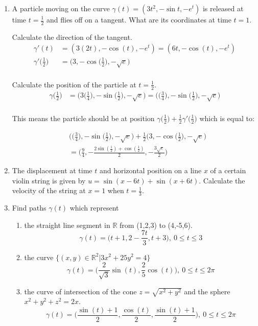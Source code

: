 \documentclass{article}
\begin{document}
\thispagestyle{fancy}

\begin{enumerate}
\item A particle moving on the curve $\gamma(t) = (3t^2, -\sin t, -e^t)$ is released at time $t=\frac{1}{2}$ and flies off on a tangent. What are its coordinates at time $t=1$.

Calculate the direction of the tangent.
\begin{align*} 
    \gamma'(t) &= (3(2t), -\cos(t), -e^t) = (6t,-\cos(t), -e^t) \\
    \gamma'\Big(\frac{1}{2}\Big) &= \Big(3, -\cos\Big(\frac{1}{2}\Big), -\sqrt{e}\Big)\\
\end{align*}

Calculate the position of the particle at $t=\frac{1}{2}$.
\begin{align*} 
    \gamma\Big(\frac{1}{2}\Big) &= \Big(3\Big(\frac{1}{4}\Big), -\sin\Big(\frac{1}{2}\Big), -\sqrt{e}\Big) = \Big(\Big(\frac{3}{4}\Big), -\sin\Big(\frac{1}{2}\Big), -\sqrt{e}\Big)\\
\end{align*}

This means the particle should be at position $\displaystyle \gamma \Big(\frac{1}{2}\Big) + \frac{1}{2} \gamma' \Big( \frac{1}{2} \Big)$ which is equal to:

\begin{align*} 
    & \Big(\Big(\frac{3}{4}\Big), -\sin\Big(\frac{1}{2}\Big), -\sqrt{e}\Big) + \frac{1}{2}\Big(3, -\cos\Big(\frac{1}{2}\Big), -\sqrt{e}\Big) \\
    &= \Big(\frac{9}{4}, -\frac{ 2 \sin(\frac{1}{2}) + \cos(\frac{1}{2})}{2},-\frac{3\sqrt{e}}{2}\Big)
\end{align*}
\newpage
\item The displacement at time $t$ and horizontal position on a line $x$ of a certain violin string is given by $u=\sin(x-6t) + \sin(x+6t)$. Calculate the velocity of the string at $x=1$ when $t=\frac{1}{3}$.

\newpage
\item Find paths $\gamma(t)$ which represent
\begin{enumerate}
    \item the straight line segment in $\mathbb{R}$ from (1,2,3) to (4,-5,6).
        \[ \gamma(t) = \Big(t+1,2-\frac{7t}{3}, t+3 \Big),\: 0 \leq t \leq 3 \]
    \item the curve $\{(x,y)\in \mathbb{R}^2|3x^2+25y^2=4\}$
        \[ \gamma(t) = \Big(\frac{2}{\sqrt{3}} \sin(t), \frac{2}{5}\cos(t)\Big), \: 0 \leq t \leq 2\pi \]
    \item the curve of intersection of the cone $z=\sqrt{x^2 + y^2}$ and the sphere $x^2+y^2+z^2 = 2x$.
        \[ \gamma(t) = \Big( \frac{\sin(t) + 1}{2}, \frac{\cos(t)}{2}, \frac{\sin(t) + 1}{2} \Big), \: 0 \leq t \leq 2\pi \]
\end{enumerate}


\end{enumerate}
\end{document}
